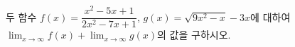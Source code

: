 두 함수 $f(x)=\dfrac{x^2-5x+1}{2x^2-7x+1}$, $g(x)=\sqrt{9x^2-x}-3x$에 대하여 $\displaystyle\lim_{x\to\infty} f(x)+\lim_{x\to\infty} g(x)$의 값을 구하시오.
